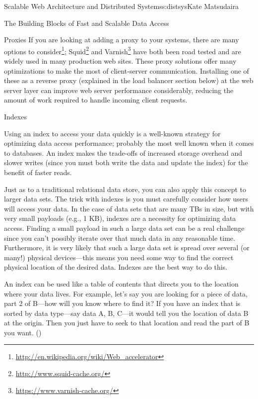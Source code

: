 \begin{aosachapter}{Scalable Web Architecture and Distributed Systems}{s:distsys}{Kate Matsudaira}
\begin{aosasect1}{The Building Blocks of Fast and Scalable Data Access}
\begin{aosasect2}{Proxies}
If you are looking at adding a proxy to your systems, there are many
options to
consider\footnote{\url{http://en.wikipedia.org/wiki/Web_accelerator}};
Squid\footnote{\url{http://www.squid-cache.org/}} and
Varnish\footnote{\url{https://www.varnish-cache.org/}} have both been
road tested and are widely used in many production web sites. These
proxy solutions offer many optimizations to make the most of
client-server communication. Installing one of these as a reverse
proxy (explained in the load balancer section below) at the web server
layer can improve web server performance considerably, reducing the
amount of work required to handle incoming client requests.

\end{aosasect2}

\begin{aosasect2}{Indexes}

Using an index to access your data quickly is a well-known strategy
for optimizing data access performance; probably the most well known 
when it comes to databases. An index makes the trade-offs of
increased storage overhead and slower writes (since you must both
write the data and update the index) for the benefit of faster reads.

Just as to a traditional relational data store, you can also apply
this concept to larger data sets. The trick with indexes is you must
carefully consider how users will access your data. In the case of
data sets that are many TBs in size, but with very small payloads
(e.g., 1 KB), indexes are a necessity for optimizing data
access. Finding a small payload in such a large data set can be a real
challenge since you can't possibly iterate over that much data in any
reasonable time. Furthermore, it is very likely that such a large data
set is spread over several (or many!) physical devices---this means
you need some way to find the correct physical location of the desired
data. Indexes are the best way to do this. 

An index can be used like a table of contents that directs you to the
location where your data lives. 
For example, let's say you are looking for a
piece of data, part 2 of B---how will you know where to find it? If
you have an index that is sorted by data type---say data A, B, C---it
would tell you the location of data B at the origin. Then you just
have to seek to that location and read the part of B you want. 
()



\end{aosasect2}
\end{aosasect1}
\end{aosachapter}

